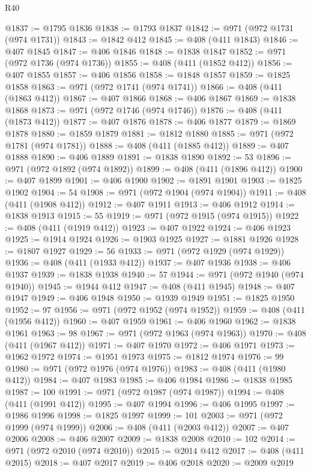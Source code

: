 \begin{lexlean}{R40}
\begin{coremodule}
@1837 := @1795 @1836
@1838 := @1793 @1837
@1842 := @971 (@972 @1731 (@974 @1731))
@1843 := @1842 @412
@1845 := @408 (@411 @1843)
@1846 := @407 @1845
@1847 := @406 @1846
@1848 := @1838 @1847
@1852 := @971 (@972 @1736 (@974 @1736))
@1855 := @408 (@411 (@1852 @412))
@1856 := @407 @1855
@1857 := @406 @1856
@1858 := @1848 @1857
@1859 := @1825 @1858
@1863 := @971 (@972 @1741 (@974 @1741))
@1866 := @408 (@411 (@1863 @412))
@1867 := @407 @1866
@1868 := @406 @1867
@1869 := @1838 @1868
@1873 := @971 (@972 @1746 (@974 @1746))
@1876 := @408 (@411 (@1873 @412))
@1877 := @407 @1876
@1878 := @406 @1877
@1879 := @1869 @1878
@1880 := @1859 @1879
@1881 := @1812 @1880
@1885 := @971 (@972 @1781 (@974 @1781))
@1888 := @408 (@411 (@1885 @412))
@1889 := @407 @1888
@1890 := @406 @1889
@1891 := @1838 @1890
@1892 := 53
@1896 := @971 (@972 @1892 (@974 @1892))
@1899 := @408 (@411 (@1896 @412))
@1900 := @407 @1899
@1901 := @406 @1900
@1902 := @1891 @1901
@1903 := @1825 @1902
@1904 := 54
@1908 := @971 (@972 @1904 (@974 @1904))
@1911 := @408 (@411 (@1908 @412))
@1912 := @407 @1911
@1913 := @406 @1912
@1914 := @1838 @1913
@1915 := 55
@1919 := @971 (@972 @1915 (@974 @1915))
@1922 := @408 (@411 (@1919 @412))
@1923 := @407 @1922
@1924 := @406 @1923
@1925 := @1914 @1924
@1926 := @1903 @1925
@1927 := @1881 @1926
@1928 := @1807 @1927
@1929 := 56
@1933 := @971 (@972 @1929 (@974 @1929))
@1936 := @408 (@411 (@1933 @412))
@1937 := @407 @1936
@1938 := @406 @1937
@1939 := @1838 @1938
@1940 := 57
@1944 := @971 (@972 @1940 (@974 @1940))
@1945 := @1944 @412
@1947 := @408 (@411 @1945)
@1948 := @407 @1947
@1949 := @406 @1948
@1950 := @1939 @1949
@1951 := @1825 @1950
@1952 := 97
@1956 := @971 (@972 @1952 (@974 @1952))
@1959 := @408 (@411 (@1956 @412))
@1960 := @407 @1959
@1961 := @406 @1960
@1962 := @1838 @1961
@1963 := 98
@1967 := @971 (@972 @1963 (@974 @1963))
@1970 := @408 (@411 (@1967 @412))
@1971 := @407 @1970
@1972 := @406 @1971
@1973 := @1962 @1972
@1974 := @1951 @1973
@1975 := @1812 @1974
@1976 := 99
@1980 := @971 (@972 @1976 (@974 @1976))
@1983 := @408 (@411 (@1980 @412))
@1984 := @407 @1983
@1985 := @406 @1984
@1986 := @1838 @1985
@1987 := 100
@1991 := @971 (@972 @1987 (@974 @1987))
@1994 := @408 (@411 (@1991 @412))
@1995 := @407 @1994
@1996 := @406 @1995
@1997 := @1986 @1996
@1998 := @1825 @1997
@1999 := 101
@2003 := @971 (@972 @1999 (@974 @1999))
@2006 := @408 (@411 (@2003 @412))
@2007 := @407 @2006
@2008 := @406 @2007
@2009 := @1838 @2008
@2010 := 102
@2014 := @971 (@972 @2010 (@974 @2010))
@2015 := @2014 @412
@2017 := @408 (@411 @2015)
@2018 := @407 @2017
@2019 := @406 @2018
@2020 := @2009 @2019

\end{coremodule}
\end{lexlean}
